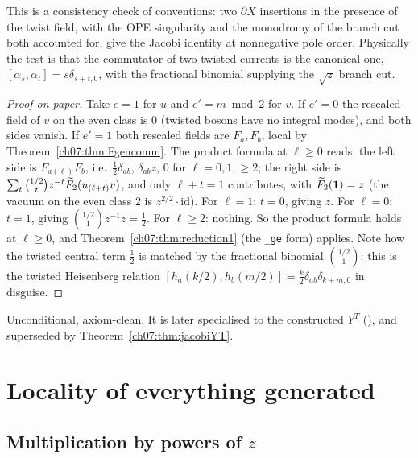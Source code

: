 \begin{physics}
This is a consistency check of conventions: two $\partial X$ insertions in the presence of the twist field, with the OPE singularity and the monodromy of the branch cut both accounted for, give the Jacobi identity at nonnegative pole order. Physically the test is that the commutator of two twisted currents is the canonical one, $[\alpha_s,\alpha_t]=s\delta_{s+t,0}$, with the fractional binomial supplying the $\sqrt z$ branch cut.
\end{physics}

\begin{proof}[Proof on paper]
Take $e=1$ for $u$ and $e' = m\bmod 2$ for $v$. If $e'=0$ the rescaled field of $v$ on the even
class is $0$ (twisted bosons have no integral modes), and both sides vanish. If $e'=1$ both
rescaled fields are $F_a, F_b$, local by Theorem~\ref{ch07:thm:Fgencomm}. The product formula at
$\ell\ge0$ reads: the left side is $F_{a(\ell)}F_b$, i.e.\ $\frac12\delta_{ab}$, $\delta_{ab}z$,
$0$ for $\ell = 0,1,\ge2$; the right side is $\sum_t\binom{1/2}{t}z^{-t}\widetilde{F}_2(u_{(\ell+t)}v)$,
and only $\ell+t=1$ contributes, with $\widetilde{F}_2(\mathbf 1) = z$ (the vacuum on the even class
$2$ is $z^{2/2}\cdot\mathrm{id}$). For $\ell=1$: $t=0$, giving $z$. For $\ell=0$: $t=1$, giving
$\binom{1/2}{1}z^{-1}z = \frac12$. For $\ell\ge2$: nothing. So the product formula holds at
$\ell\ge0$, and Theorem~\ref{ch07:thm:reduction1} (the \verb|_ge| form) applies. Note how the
twisted central term $\frac12$ is matched by the fractional binomial $\binom{1/2}{1}$: this is
the twisted Heisenberg relation $[h_a(k/2),h_b(m/2)] = \frac k2\delta_{ab}\delta_{k+m,0}$ in
disguise.
\end{proof}

\begin{status}
Unconditional, axiom-clean. It is later specialised to the constructed $Y^T$
(), and superseded by Theorem~\ref{ch07:thm:jacobiYT}.
\end{status}

\section{Locality of everything generated}\label{ch07:sec:locality}

\subsection{Multiplication by powers of \texorpdfstring{$z$}{z}}

